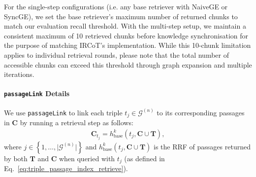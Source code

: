For the single-step configurations (i.e. any base retriever with NaiveGE or SyncGE), we set the base retriever's maximum number of returned chunks to match our evaluation recall threshold. With the multi-step setup, we maintain a consistent maximum of 10 retrieved chunks before knowledge synchronisation for the purpose of matching IRCoT's implementation. While this 10-chunk limitation applies to individual retrieval rounds, please note that the total number of accessible chunks can exceed this threshold through graph expansion and multiple \gear iterations.


\paragraph{\textrm{\texttt{passageLink}} Details\label{appendixpara:passage_link}}
We use \texttt{passageLink} to link each triple $t_j \in \mathcal{G}^{(n)}$ to its corresponding passages in $\mathbf{C}$ by running a retrieval step as follows:
\begin{align}
\mathbf{C}_{t_j} = h^k_{\text{base}}\left( t_j, {\mathbf{C} \cup \mathbf{T}} \right),
\end{align}where $j \in \left \{1, \dots, \vert\mathcal{G}^{(n)}\vert \right \}$ and $h^k_{\text{base}}\left( t_j, {\mathbf{C} \cup \mathbf{T}} \right)$ is the RRF of passages returned by both $\mathbf{T}$ and $\mathbf{C}$ when queried with $t_j$ (as defined in Eq.~\ref{eq:triple_passage_index_retrieve}).
